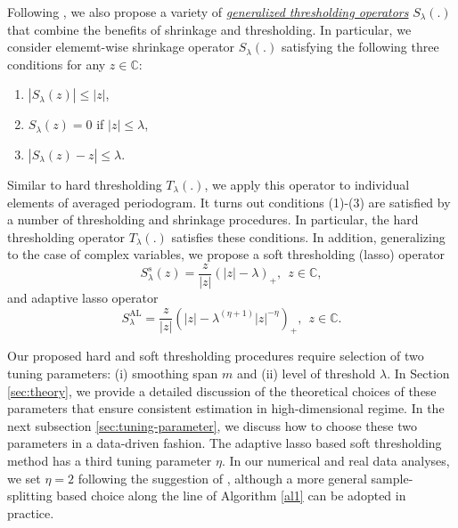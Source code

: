 Following \citet{rothman2009generalized},  we also propose a variety of \textit{\underline{generalized thresholding operators}} $S_\lambda(.)$ that combine the benefits of shrinkage and thresholding. In particular, we consider elememt-wise shrinkage operator $S_\lambda(.)$ satisfying the following three conditions for any $z \in \mathbb{C}$: 
\begin{enumerate}[(1)]
\item $|S_\lambda(z)|\le |z|$,
\item $S_\lambda(z) = 0$ if $|z|\le \lambda$,
\item $|S_\lambda(z)-z|\le \lambda $.
\end{enumerate}
Similar to hard thresholding $T_\lambda(.)$, we apply this operator to individual elements of averaged periodogram. It turns out conditions (1)-(3) are satisfied by a number of thresholding and shrinkage procedures. 
In particular, the hard thresholding operator $T_\lambda(.)$ satisfies these conditions. In addition, generalizing \citet{rothman2009generalized} to the case of complex variables, we propose a soft thresholding (lasso) operator  
\begin{equation}
S_\lambda^s(z) = \frac{z}{|z|} \left(|z|-\lambda\right)_+, ~~ z \in \mathbb{C}, \nonumber
\end{equation}
and adaptive lasso operator 
\begin{equation}
S_\lambda^{\text{AL}} = \frac{z}{|z|} \left(|z| - \lambda^{(\eta+1)}|z|^{-\eta}\right)_+,  ~~ z \in \mathbb{C}. \nonumber
\end{equation}

Our proposed hard and soft thresholding procedures require selection of two tuning parameters: (i) smoothing span $m$ and (ii) level of threshold $\lambda$. In Section \ref{sec:theory}, we provide a detailed discussion of the theoretical choices of these parameters that ensure consistent estimation in high-dimensional regime. In the next subsection \ref{sec:tuning-parameter}, we discuss how to choose these two parameters in a data-driven fashion. The adaptive lasso based soft thresholding method has a third tuning parameter $\eta$. In our numerical and real data analyses, we set $\eta = 2$ following the suggestion of \cite{rothman2009generalized}, although a more general sample-splitting based choice along the line of Algorithm \ref{al1} can be adopted in practice.

